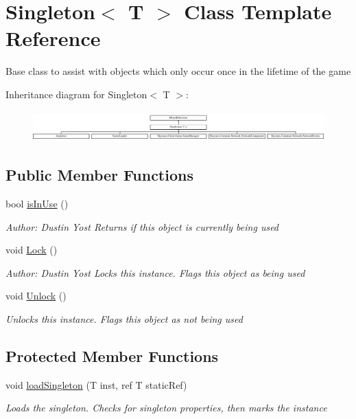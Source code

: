 \hypertarget{class_singleton_3_01_t_01_4}{\section{Singleton$<$ T $>$ Class Template Reference}
\label{class_singleton_3_01_t_01_4}
}


Base class to assist with objects which only occur once in the lifetime of the game  


Inheritance diagram for Singleton$<$ T $>$\-:\begin{figure}[H]
\begin{center}
\leavevmode
\includegraphics[height=1.183099cm]{class_singleton_3_01_t_01_4}
\end{center}
\end{figure}
\subsection*{Public Member Functions}
\begin{DoxyCompactItemize}
\item 
bool \hyperlink{class_singleton_3_01_t_01_4_aaf243fc3c85154c237fb3086b67ef6ff}{is\-In\-Use} ()
\begin{DoxyCompactList}\small\item\em Author\-: Dustin Yost Returns if this object is currently being used \end{DoxyCompactList}\item 
void \hyperlink{class_singleton_3_01_t_01_4_a93ff9802b7793e342ce7e64983a59a0d}{Lock} ()
\begin{DoxyCompactList}\small\item\em Author\-: Dustin Yost Locks this instance. Flags this object as being used \end{DoxyCompactList}\item 
void \hyperlink{class_singleton_3_01_t_01_4_a4832d0cc115af2e3fe38947538f17dee}{Unlock} ()
\begin{DoxyCompactList}\small\item\em Unlocks this instance. Flags this object as not being used \end{DoxyCompactList}\end{DoxyCompactItemize}
\subsection*{Protected Member Functions}
\begin{DoxyCompactItemize}
\item 
void \hyperlink{class_singleton_3_01_t_01_4_abd0672430ce6d6c8ae4c01905f4bd4b1}{load\-Singleton} (T inst, ref T static\-Ref)
\begin{DoxyCompactList}\small\item\em Loads the singleton. Checks for singleton properties, then marks the instance \end{DoxyCompactList}\end{DoxyCompactItemize}



